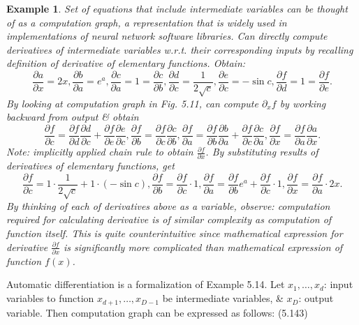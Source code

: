 \documentclass{article}
\newtheorem{example}{Example}
\begin{document}
\begin{itemize}
\begin{itemize}
\begin{itemize}
\begin{example}
				Set of equations that include intermediate variables can be thought of as a computation graph, a representation that is widely used in implementations of neural network software libraries. Can directly compute derivatives of intermediate variables w.r.t. their corresponding inputs by recalling definition of derivative of elementary functions. Obtain:
				\begin{equation}
					\frac{\partial a}{\partial x} = 2x,\frac{\partial b}{\partial a} = e^a,\frac{\partial c}{\partial a} = 1 = \frac{\partial c}{\partial b},\frac{\partial d}{\partial c} = \frac{1}{2\sqrt{c}},\frac{\partial e}{\partial c} = -\sin c,\frac{\partial f}{\partial d} = 1 = \frac{\partial f}{\partial e}.
				\end{equation}
				By looking at computation graph in Fig. 5.11, can compute $\partial_xf$ by working backward from output \& obtain
				\begin{equation}
					\frac{\partial f}{\partial c} = \frac{\partial f}{\partial d}\frac{\partial d}{\partial c} + \frac{\partial f}{\partial e}\frac{\partial e}{\partial c},\frac{\partial f}{\partial b} = \frac{\partial f}{\partial c}\frac{\partial c}{\partial b},\frac{\partial f}{\partial a} = \frac{\partial f}{\partial b}\frac{\partial b}{\partial a} + \frac{\partial f}{\partial c}\frac{\partial c}{\partial a},\frac{\partial f}{\partial x} = \frac{\partial f}{\partial a}\frac{\partial a}{\partial x}.
				\end{equation}
				Note: implicitly applied chain rule to obtain $\frac{\partial f}{\partial x}$. By substituting results of derivatives of elementary functions, get
				\begin{equation}
					\frac{\partial f}{\partial c} = 1\cdot\frac{1}{2\sqrt{c}} + 1\cdot(-\sin c),\frac{\partial f}{\partial b} = \frac{\partial f}{\partial c}\cdot1,\frac{\partial f}{\partial a} = \frac{\partial f}{\partial b}e^a + \frac{\partial f}{\partial c}\cdot1,\frac{\partial f}{\partial x} = \frac{\partial f}{\partial a}\cdot2x.
				\end{equation}
				By thinking of each of derivatives above as a variable, observe: computation required for calculating derivative is of similar complexity as computation of function itself. This is quite counterintuitive since mathematical expression for derivative $\frac{\partial f}{\partial x}$ is significantly more complicated than mathematical expression of function $f(x)$.
			\end{example}
			Automatic differentiation is a formalization of Example 5.14. Let $x_1,\ldots,x_d$: input variables to function $x_{d+1},\ldots,x_{D-1}$ be intermediate variables, \& $x_D$: output variable. Then computation graph can be expressed as follows: (5.143)

\end{itemize}
\end{itemize}
\end{itemize}
\end{document}
